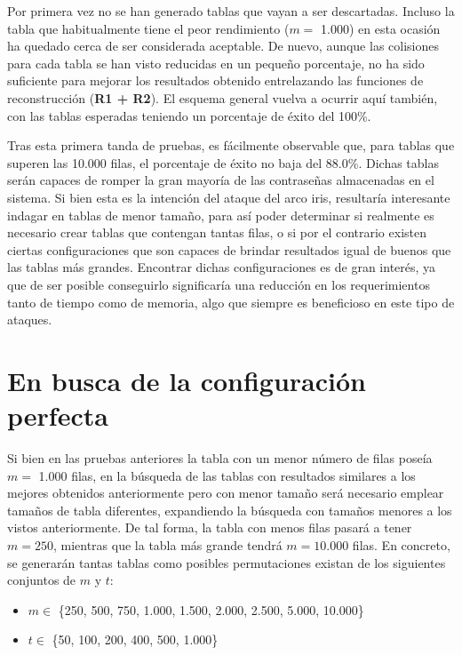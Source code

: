 \documentclass[12pt,spanish,listoffigures,listoftables]{tfgetsinf}
\begin{document}
Por primera vez no se han generado tablas que vayan a ser descartadas. Incluso la tabla que habitualmente tiene el peor rendimiento ($m =$ 1.000) en esta ocasión ha quedado cerca de ser considerada aceptable. De nuevo, aunque las colisiones para cada tabla se han visto reducidas en un pequeño porcentaje, no ha sido suficiente para mejorar los resultados obtenido entrelazando las funciones de reconstrucción (\textbf{R1 + R2}). El esquema general vuelva a ocurrir aquí también, con las tablas esperadas teniendo un porcentaje de éxito del 100\%.

Tras esta primera tanda de pruebas, es fácilmente observable que, para tablas que superen las 10.000 filas, el porcentaje de éxito no baja del 88.0\%. Dichas tablas serán capaces de romper la gran mayoría de las contraseñas almacenadas en el sistema. Si bien esta es la intención del ataque del arco iris, resultaría interesante indagar en tablas de menor tamaño, para así poder determinar si realmente es necesario crear tablas que contengan tantas filas, o si por el contrario existen ciertas configuraciones que son capaces de brindar resultados igual de buenos que las tablas más grandes. Encontrar dichas configuraciones es de gran interés, ya que de ser posible conseguirlo significaría una reducción en los requerimientos tanto de tiempo como de memoria, algo que siempre es beneficioso en este tipo de ataques.
\\


\section{En busca de la configuración perfecta} \label{config perf}

Si bien en las pruebas anteriores la tabla con un menor número de filas poseía $m =$ 1.000 filas, en la búsqueda de las tablas con resultados similares a los mejores obtenidos anteriormente pero con menor tamaño será necesario emplear tamaños de tabla diferentes, expandiendo la búsqueda con tamaños menores a los vistos anteriormente. De tal forma, la tabla con menos filas pasará a tener $m = 250$, mientras que la tabla más grande tendrá $m = 10.000$ filas. En concreto, se generarán tantas tablas como posibles permutaciones existan de los siguientes conjuntos de $m$ y $t$:
\\
\begin{itemize}

    \item $m \in$ \{250, 500, 750, 1.000, 1.500, 2.000, 2.500, 5.000, 10.000\}
    
    \item $t \in$ \{50, 100, 200, 400, 500, 1.000\}
    
\end{itemize}
\end{document}
